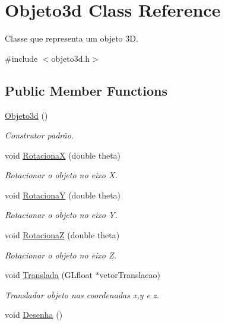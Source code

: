 \hypertarget{class_objeto3d}{\section{Objeto3d Class Reference}
\label{class_objeto3d}
}


Classe que representa um objeto 3\+D.  




{\ttfamily \#include $<$objeto3d.\+h$>$}

\subsection*{Public Member Functions}
\begin{DoxyCompactItemize}
\item 
\hypertarget{class_objeto3d_af272029a83c257f9e89c9bfaba63896e}{\hyperlink{class_objeto3d_af272029a83c257f9e89c9bfaba63896e}{Objeto3d} ()}\label{class_objeto3d_af272029a83c257f9e89c9bfaba63896e}

\begin{DoxyCompactList}\small\item\em Construtor padrão. \end{DoxyCompactList}\item 
void \hyperlink{class_objeto3d_aa6151f7bb497a8cfbb0140ed4d25d9a5}{Rotaciona\+X} (double theta)
\begin{DoxyCompactList}\small\item\em Rotacionar o objeto no eixo X. \end{DoxyCompactList}\item 
void \hyperlink{class_objeto3d_a911c49f98bee10cd9b4bf5244c6eb95f}{Rotaciona\+Y} (double theta)
\begin{DoxyCompactList}\small\item\em Rotacionar o objeto no eixo Y. \end{DoxyCompactList}\item 
void \hyperlink{class_objeto3d_a571bd8f09c09530a20171dfbec084975}{Rotaciona\+Z} (double theta)
\begin{DoxyCompactList}\small\item\em Rotacionar o objeto no eixo Z. \end{DoxyCompactList}\item 
void \hyperlink{class_objeto3d_a256c85a33b69606b32ae9b0093a20988}{Translada} (G\+Lfloat $\ast$vetor\+Translacao)
\begin{DoxyCompactList}\small\item\em Transladar objeto nas coordenadas x,y e z. \end{DoxyCompactList}\item 
\hypertarget{class_objeto3d_af2a8eb55a37b7433c81805967d84e101}{void \hyperlink{class_objeto3d_af2a8eb55a37b7433c81805967d84e101}{Desenha} ()}\label{class_objeto3d_af2a8eb55a37b7433c81805967d84e101}


\end{DoxyCompactItemize}
